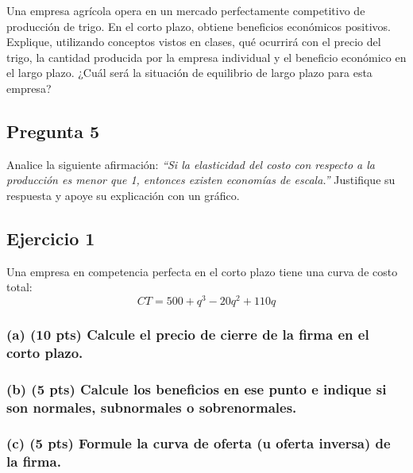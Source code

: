 \documentclass[12pt,letterpaper]{article}
\begin{document}
Una empresa agrícola opera en un mercado perfectamente competitivo de producción de trigo. En el corto plazo, obtiene beneficios económicos positivos. Explique, utilizando conceptos vistos en clases, qué ocurrirá con el precio del trigo, la cantidad producida por la empresa individual y el beneficio económico en el largo plazo. ¿Cuál será la situación de equilibrio de largo plazo para esta empresa?

\subsection*{Pregunta 5}

Analice la siguiente afirmación: \textit{``Si la elasticidad del costo con respecto a la producción es menor que 1, entonces existen economías de escala.''} Justifique su respuesta y apoye su explicación con un gráfico.





\newpage


\subsection*{Ejercicio 1}

Una empresa en competencia perfecta en el corto plazo tiene una curva de costo total:
\[
CT = 500 + q^3 - 20q^2 + 110q
\]

\subsubsection*{(a) (10 pts) Calcule el precio de cierre de la firma en el corto plazo.}


\subsubsection*{(b) (5 pts) Calcule los beneficios en ese punto e indique si son normales, subnormales o sobrenormales.}

\subsubsection*{(c) (5 pts) Formule la curva de oferta (u oferta inversa) de la firma.}
\end{document}
